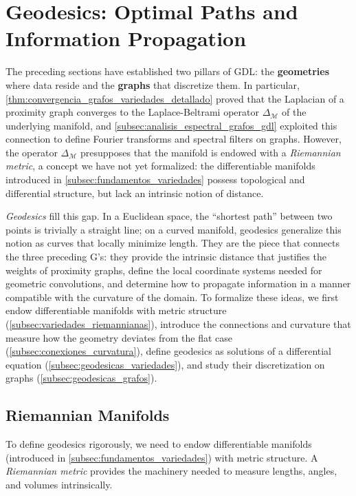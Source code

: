 \section{Geodesics: Optimal Paths and Information Propagation}\label{sec:geodesicas_propagacion}

The preceding sections have established two pillars of \gls{GDL}: the \textbf{geometries} where data reside and the \textbf{graphs} that discretize them. In particular, \autoref{thm:convergencia_grafos_variedades_detallado} proved that the Laplacian of a proximity graph converges to the Laplace-Beltrami operator $\Delta_\mathcal{M}$ of the underlying manifold, and \autoref{subsec:analisis_espectral_grafos_gdl} exploited this connection to define Fourier transforms and spectral filters on graphs. However, the operator $\Delta_\mathcal{M}$ presupposes that the manifold is endowed with a \textit{Riemannian metric}, a concept we have not yet formalized: the differentiable manifolds introduced in \autoref{subsec:fundamentos_variedades} possess topological and differential structure, but lack an intrinsic notion of distance.

\textit{Geodesics} fill this gap. In a Euclidean space, the ``shortest path'' between two points is trivially a straight line; on a curved manifold, geodesics generalize this notion as curves that locally minimize length. They are the piece that connects the three preceding G's: they provide the intrinsic distance that justifies the weights of proximity graphs, define the local coordinate systems needed for geometric convolutions, and determine how to propagate information in a manner compatible with the curvature of the domain. To formalize these ideas, we first endow differentiable manifolds with metric structure (\autoref{subsec:variedades_riemannianas}), introduce the connections and curvature that measure how the geometry deviates from the flat case (\autoref{subsec:conexiones_curvatura}), define geodesics as solutions of a differential equation (\autoref{subsec:geodesicas_variedades}), and study their discretization on graphs (\autoref{subsec:geodesicas_grafos}).

\subsection{Riemannian Manifolds}\label{subsec:variedades_riemannianas}

To define geodesics rigorously, we need to endow differentiable manifolds (introduced in \autoref{subsec:fundamentos_variedades}) with metric structure. A \textit{Riemannian metric} provides the machinery needed to measure lengths, angles, and volumes intrinsically.

